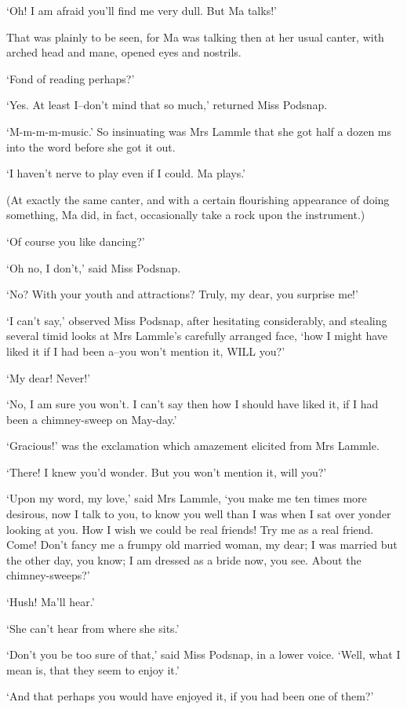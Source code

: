 ‘Oh! I am afraid you’ll find me very dull. But Ma talks!’

That was plainly to be seen, for Ma was talking then at her usual
canter, with arched head and mane, opened eyes and nostrils.

‘Fond of reading perhaps?’

‘Yes. At least I--don’t mind that so much,’ returned Miss Podsnap.

‘M-m-m-m-music.’ So insinuating was Mrs Lammle that she got half a dozen
ms into the word before she got it out.

‘I haven’t nerve to play even if I could. Ma plays.’

(At exactly the same canter, and with a certain flourishing appearance
of doing something, Ma did, in fact, occasionally take a rock upon the
instrument.)

‘Of course you like dancing?’

‘Oh no, I don’t,’ said Miss Podsnap.

‘No? With your youth and attractions? Truly, my dear, you surprise me!’

‘I can’t say,’ observed Miss Podsnap, after hesitating considerably, and
stealing several timid looks at Mrs Lammle’s carefully arranged face,
‘how I might have liked it if I had been a--you won’t mention it, WILL
you?’

‘My dear! Never!’

‘No, I am sure you won’t. I can’t say then how I should have liked it,
if I had been a chimney-sweep on May-day.’

‘Gracious!’ was the exclamation which amazement elicited from Mrs
Lammle.

‘There! I knew you’d wonder. But you won’t mention it, will you?’

‘Upon my word, my love,’ said Mrs Lammle, ‘you make me ten times more
desirous, now I talk to you, to know you well than I was when I sat over
yonder looking at you. How I wish we could be real friends! Try me as a
real friend. Come! Don’t fancy me a frumpy old married woman, my dear;
I was married but the other day, you know; I am dressed as a bride now,
you see. About the chimney-sweeps?’

‘Hush! Ma’ll hear.’

‘She can’t hear from where she sits.’

‘Don’t you be too sure of that,’ said Miss Podsnap, in a lower voice.
‘Well, what I mean is, that they seem to enjoy it.’

‘And that perhaps you would have enjoyed it, if you had been one of
them?’

